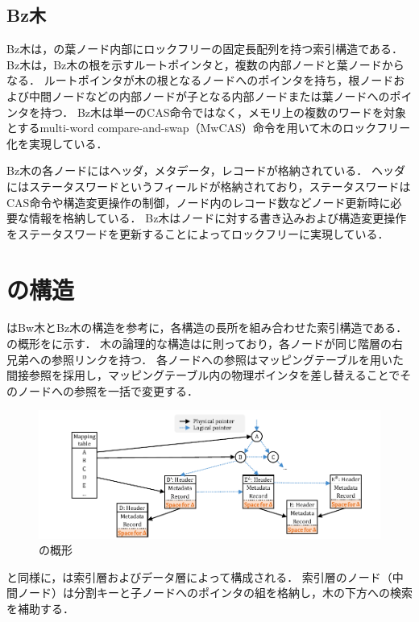 \subsection{Bz木}

Bz木は，\Bptree{}の葉ノード内部にロックフリーの固定長配列を持つ索引構造である．
Bz木は，Bz木の根を示すルートポインタと，複数の内部ノードと葉ノードからなる．
ルートポインタが木の根となるノードへのポインタを持ち，根ノードおよび中間ノードなどの内部ノードが子となる内部ノードまたは葉ノードへのポインタを持つ．
Bz木は単一のCAS命令ではなく，メモリ上の複数のワードを対象とするmulti-word compare-and-swap（MwCAS）命令を用いて木のロックフリー化を実現している．

Bz木の各ノードにはヘッダ，メタデータ，レコードが格納されている．
ヘッダにはステータスワードというフィールドが格納されており，ステータスワードはCAS命令や構造変更操作の制御，ノード内のレコード数などノード更新時に必要な情報を格納している．
Bz木はノードに対する書き込みおよび構造変更操作をステータスワードを更新することによってロックフリーに実現している．

\section{\Bctree{}の構造}
\label{sec:bc_tree_structure}

\Bctree{}はBw木とBz木の構造を参考に，各構造の長所を組み合わせた索引構造である．
\Bctree{}の概形を\Fig{\ref{fig:bc_tree-structure}}に示す．
木の論理的な構造は\Blinktree{}に則っており，各ノードが同じ階層の右兄弟への参照リンクを持つ．
各ノードへの参照はマッピングテーブルを用いた間接参照を採用し，マッピングテーブル内の物理ポインタを差し替えることでそのノードへの参照を一括で変更する．

\begin{figure}[t]
    \centering
    \includegraphics{./figures/Bc-structure.pdf}
    \caption{\Bctree{}の概形}
    \label{fig:bc_tree-structure}
\end{figure}

\Bptree{}と同様に，\Bctree{}は索引層およびデータ層によって構成される．
索引層のノード（中間ノード）は分割キーと子ノードへのポインタの組を格納し，木の下方への検索を補助する．

